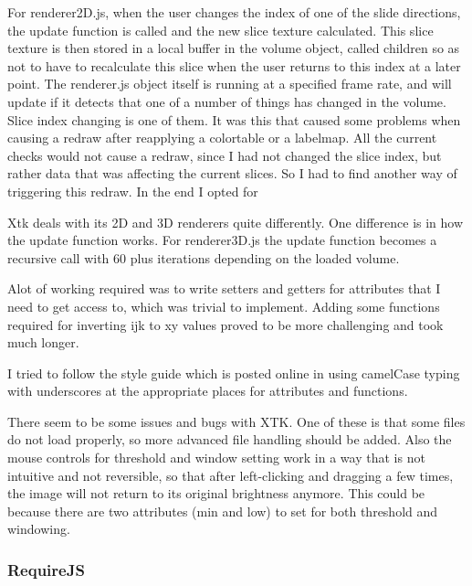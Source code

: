 \documentclass[a4paper,11pt,titlepage]{article}
\begin{document}
For renderer2D.js, when the user changes the index of one of the slide directions, the update function is called and the new slice texture calculated. This slice texture is then stored in a local buffer in the volume object, called children so as not to have to recalculate this slice when the user returns to this index at a later point. The renderer.js object itself is running at a specified frame rate, and will update if it detects that one of a number of things has changed in the volume. Slice index changing is one of them. It was this that caused some problems when causing a redraw after reapplying a colortable or a labelmap. All the current checks would not cause a redraw, since I had not changed the slice index, but rather data that was affecting the current slices. So I had to find another way of triggering this redraw. In the end I opted for 




Xtk deals with its 2D and 3D renderers quite differently. One difference is in how the update function works. For renderer3D.js the update function becomes a recursive call with 60 plus iterations depending on the loaded volume.



Alot of working required was to write setters and getters for attributes that I need to get access to, which was trivial to implement. Adding some functions required for inverting ijk to xy values proved to be more challenging and took much longer.

I tried to follow the style guide which is posted online in using camelCase typing with underscores at the appropriate places for attributes and functions.

There seem to be some issues and bugs with XTK. One of these is that some files do not load properly, so more advanced file handling should be added. Also the mouse controls for threshold and window setting work in a way that is not intuitive and not reversible, so that after left-clicking and dragging a few times, the image will not return to its original brightness anymore. This could be because there are two attributes (min and low) to set for both threshold and windowing.




\subsubsection{RequireJS}
\end{document}

